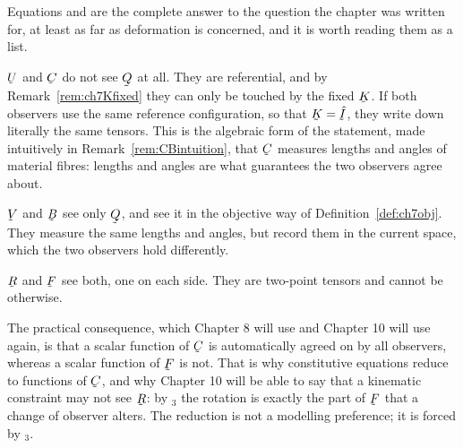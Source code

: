 \begin{remark}\label{rem:ch7whosees}
Equations  and  are the complete answer to the
question the chapter was written for, at least as far as deformation is
concerned, and it is worth reading them as a list.

$\bU$ and $\bC$ do not see $\bQ$ at all. They are referential, and by
Remark~\ref{rem:ch7Kfixed} they can only be touched by the fixed $\bK$.
If both observers use the same reference configuration, so that
$\bK=\hI$, they write down literally the same tensors. This is the
algebraic form of the statement, made intuitively in
Remark~\ref{rem:CBintuition}, that $\bC$ measures lengths and angles of
material fibres: lengths and angles are what  guarantees the two
observers agree about.

$\bV$ and $\bB$ see only $\bQ$, and see it in the objective way of
Definition~\ref{def:ch7obj}. They measure the same lengths and angles,
but record them in the current space, which the two observers hold
differently.

$\bR$ and $\bF$ see both, one on each side. They are two-point tensors
and cannot be otherwise.

The practical consequence, which Chapter 8 will use and Chapter 10 will
use again, is that a scalar function of $\bC$ is automatically agreed on
by all observers, whereas a scalar function of $\bF$ is not. That is why
constitutive equations reduce to functions of $\bC$, and why
Chapter 10 will be able to say that a kinematic constraint may not see
$\bR$: by $_{3}$ the rotation is exactly the part of $\bF$
that a change of observer alters. The reduction is not a modelling
preference; it is forced by $_{3}$.
\end{remark}

